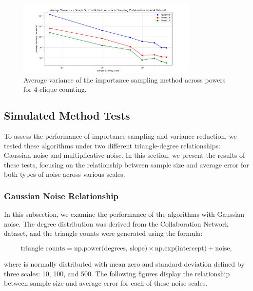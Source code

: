 \documentclass[11pt]{article}
\begin{document}
\begin{figure}[H]
    \centering
    \includegraphics[width=0.8\textwidth]{plots/4-clique/importance-sampling/avg_variance_Importance Sampling.png}
    \caption{Average variance of the importance sampling method across powers for 4-clique counting.}
    \label{fig:4_clique_avg_variance_importance_sampling}
\end{figure}

\subsection{Simulated Method Tests}

To assess the performance of importance sampling and variance reduction, we tested these algorithms under two different triangle-degree relationships: Gaussian noise and multiplicative noise. In this section, we present the results of these tests, focusing on the relationship between sample size and average error for both types of noise across various scales.

\subsubsection{Gaussian Noise Relationship}

In this subsection, we examine the performance of the algorithms with Gaussian noise. The degree distribution was derived from the Collaboration Network dataset, and the triangle counts were generated using the formula:

\[
\text{triangle counts} = \text{np.power(degrees, slope)} \times \text{np.exp(intercept)} + \text{noise},
\]

where  is normally distributed with mean zero and standard deviation defined by three scales: 10, 100, and 500. The following figures display the relationship between sample size and average error for each of these noise scales.
\end{document}
